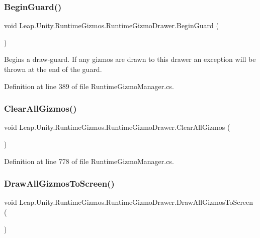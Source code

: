 \subsubsection{\texorpdfstring{BeginGuard()}{BeginGuard()}}
{\footnotesize\ttfamily void Leap.\+Unity.\+Runtime\+Gizmos.\+Runtime\+Gizmo\+Drawer.\+Begin\+Guard (\begin{DoxyParamCaption}{ }\end{DoxyParamCaption})}



Begins a draw-\/guard. If any gizmos are drawn to this drawer an exception will be thrown at the end of the guard. 



Definition at line 389 of file Runtime\+Gizmo\+Manager.\+cs.

\mbox{\label{class_leap_1_1_unity_1_1_runtime_gizmos_1_1_runtime_gizmo_drawer_a3997e67f725121479b6d305b02defe79}} 
\subsubsection{\texorpdfstring{ClearAllGizmos()}{ClearAllGizmos()}}
{\footnotesize\ttfamily void Leap.\+Unity.\+Runtime\+Gizmos.\+Runtime\+Gizmo\+Drawer.\+Clear\+All\+Gizmos (\begin{DoxyParamCaption}{ }\end{DoxyParamCaption})}



Definition at line 778 of file Runtime\+Gizmo\+Manager.\+cs.

\mbox{\label{class_leap_1_1_unity_1_1_runtime_gizmos_1_1_runtime_gizmo_drawer_ae75ab0c30034af8cbc2aaf967c2136c3}} 
\subsubsection{\texorpdfstring{DrawAllGizmosToScreen()}{DrawAllGizmosToScreen()}}
{\footnotesize\ttfamily void Leap.\+Unity.\+Runtime\+Gizmos.\+Runtime\+Gizmo\+Drawer.\+Draw\+All\+Gizmos\+To\+Screen (\begin{DoxyParamCaption}{ }\end{DoxyParamCaption})}



